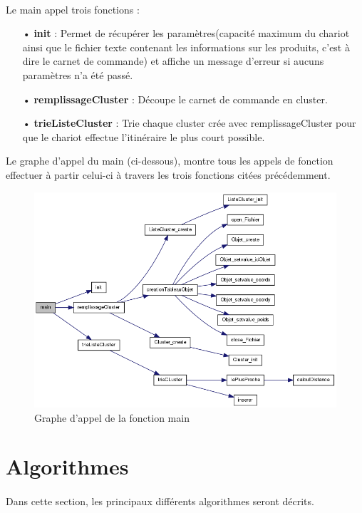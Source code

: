 \documentclass[twoside,UTF8]{EPURapport}
\begin{document}
\paragraph{}
Le main appel trois fonctions : 
\begin{itemize}
\item[•]\textbf{init} : Permet de récupérer les paramètres(capacité maximum du chariot ainsi que le fichier texte contenant les informations sur les produits, c'est à dire le carnet de commande) et affiche un message d'erreur si aucuns paramètres n'a été passé.
\item[•]\textbf{remplissageCluster} : Découpe le carnet de commande en cluster.
\item[•]\textbf{trieListeCluster} : Trie chaque cluster crée avec remplissageCluster pour que le chariot effectue l'itinéraire le plus court possible.
\end{itemize}

Le graphe d'appel du main (ci-dessous), montre tous les appels de fonction effectuer à partir celui-ci à travers les trois fonctions citées précédemment.

\begin{figure}[!h]
	\center
	\includegraphics[scale=0.5]{images/main_appel.png}
	\caption{Graphe d'appel de la fonction main}
\end{figure}

\section{Algorithmes}

\paragraph{}
Dans cette section, les principaux différents algorithmes seront décrits.
\end{document}
